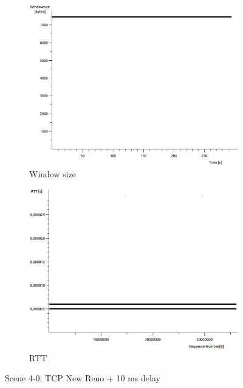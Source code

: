 \documentclass[conference,a4paper]{../../sty/IEEEtran}
\begin{document}
\begin{figure}
\begin{subfigure}[b]{0.2\textwidth}
  \includegraphics[width=\textwidth]{s4-0_wnd}
  \caption{Window size}
 \end{subfigure}
 \begin{subfigure}[b]{0.2\textwidth}
  \includegraphics[width=\textwidth]{s4-0_rtt}
  \caption{RTT}
 \end{subfigure}
 \caption{Scene 4-0: TCP New Reno + 10 ms delay}
\end{figure}
\end{document}

